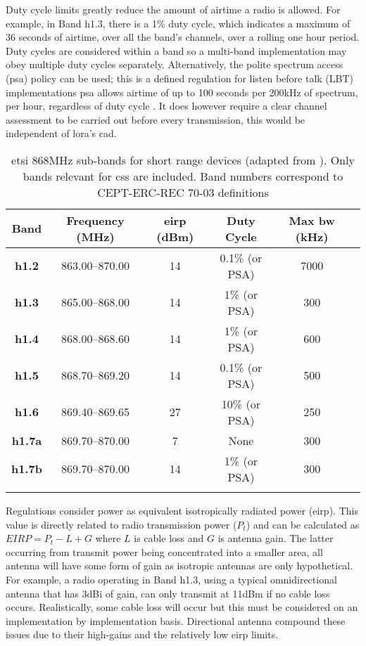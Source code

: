 Duty cycle limits greatly reduce the amount of airtime a radio is allowed. For example, in Band h1.3, there is a 1\% duty cycle, which indicates a maximum of 36 seconds of airtime, over all the band's channels, over a rolling one hour period. Duty cycles are considered within a band so a multi-band implementation may obey multiple duty cycles separately. Alternatively, the polite spectrum access (\ac{psa}) policy can be used; this is a defined regulation for listen before talk (LBT) implementations \ac{psa} allows airtime of up to 100 seconds per 200kHz of spectrum, per hour, regardless of duty cycle \cite{3YP:ETSI_PSA}. It does however require a clear channel assessment to be carried out before every transmission, this would be independent of \ac{lora}'s \ac{cad}.
 
\begin{table}
\centering\small
\caption[\ac{etsi} 868MHz sub-band breakdown]{\ac{etsi} 868MHz sub-bands for short range devices (adapted from \cite{3YP:ETSI_HARMONISED_REG}). Only bands relevant for \ac{css} are included. Band numbers correspond to CEPT-ERC-REC 70-03 definitions \cite{3YP:CEPT_ERC_REC}}
\label{tab:ETSIBands}
\renewcommand*{\arraystretch}{1.1}
\begin{tabular}{c|ccccc}
    \toprule
    \textbf{Band} & \textbf{Frequency} (MHz) & \textbf{\ac{eirp}} (dBm)  & \textbf{Duty Cycle} & \textbf{Max \ac{bw}} (kHz) \\
    \midrule\addlinespace
    \textbf{h1.2} & 863.00--870.00 & 14 & 0.1\% (or PSA) & 7000 \\
    \textbf{h1.3} & 865.00--868.00 & 14 & 1\% (or PSA) & 300 \\
    \textbf{h1.4} & 868.00--868.60 & 14 & 1\% (or PSA) & 600 \\
    \textbf{h1.5} & 868.70--869.20 & 14 & 0.1\% (or PSA) & 500 \\
    \textbf{h1.6} & 869.40--869.65 & 27 & 10\% (or PSA) & 250 \\
    \textbf{h1.7a} & 869.70--870.00 & 7 & None & 300 \\
    \textbf{h1.7b} & 869.70--870.00 & 14 & 1\% (or PSA) & 300 \\   
    \addlinespace\bottomrule
\end{tabular}
\end{table}

Regulations consider power as equivalent isotropically radiated power (\ac{eirp}). This value is directly related to radio transmission power ($P_t$) and can be calculated as $EIRP = P_t - L + G$ where $L$ is cable loss and $G$ is antenna gain. The latter occurring from transmit power being concentrated into a smaller area, all antenna will have some form of gain as isotropic antennas are only hypothetical. For example, a radio operating in Band h1.3, using a typical omnidirectional antenna that has 3dBi of gain, can only transmit at 11dBm if no cable loss occurs. Realistically, some cable loss will occur but this must be considered on an implementation by implementation basis. Directional antenna compound these issues due to their high-gains and the relatively low \ac{eirp} limits.

